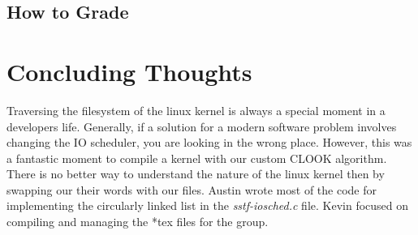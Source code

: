 \documentclass[onecolumn, draftclsnofoot,10pt, compsoc]{IEEEtran}
\begin{document}
        \subsection{How to Grade}
        
        \section{Concluding Thoughts}
        Traversing the filesystem of the linux kernel is always a special moment in a developers life. Generally, if a solution for a modern software problem involves changing the IO scheduler, you are looking in the wrong place. However, this was a fantastic moment to compile a kernel with our custom CLOOK algorithm. There is no better way to understand the nature of the linux kernel then by swapping our their words with our files. Austin wrote most of the code for implementing the circularly linked list in the \textit{sstf-iosched.c} file. Kevin focused on compiling and managing the *tex files for the group. 
		
        
        
        
\end{document}
